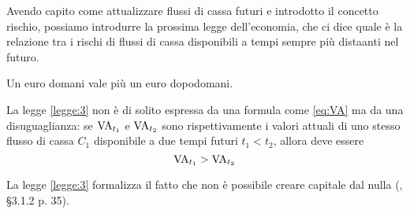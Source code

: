 Avendo capito come attualizzare flussi di cassa futuri e introdotto il concetto rischio, possiamo introdurre
la prossima legge dell'economia, che ci dice quale è la relazione tra i rischi di flussi di cassa disponibili
a tempi sempre più distaanti nel futuro.

\begin{legge}\label{legge:3}
  Un euro domani vale più un euro dopodomani.
\end{legge}

La legge \ref{legge:3} non è di solito espressa da una formula come \eqref{eq:VA} ma da una disuguaglianza:
se $\mathrm{VA}_{t_1}$ e $\mathrm{VA}_{t_2}$ sono rispettivamente i valori attuali di uno stesso flusso di cassa $C_1$ disponibile
a due tempi futuri $t_1<t_2$, allora deve essere
\begin{equation}
  \label{eq:legge2}
  \mathrm{VA}_{t_1}>\mathrm{VA}_{t_2}
\end{equation}

La legge \ref{legge:3} formalizza il fatto che non è possibile creare capitale dal nulla (\cite{brealey_et_al1999},
§3.1.2 p. 35).